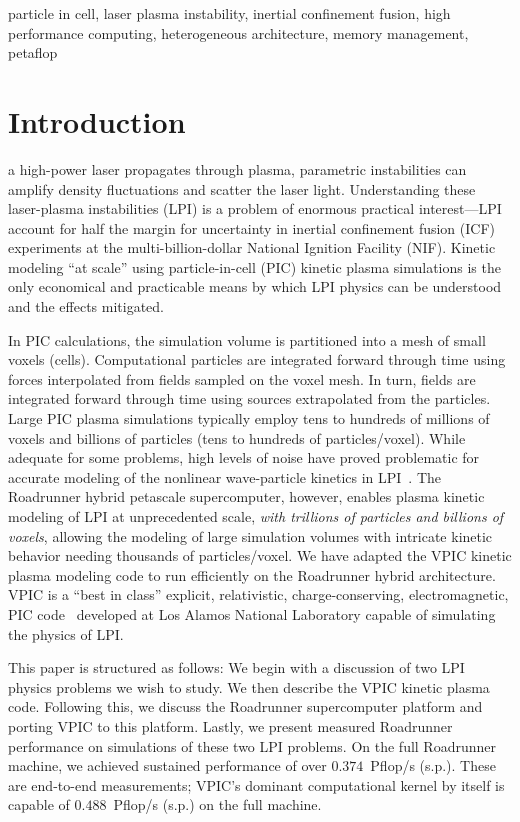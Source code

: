 \documentclass[journal,twoside]{IEEEtran}
\begin{document}
\begin{IEEEkeywords}
particle in cell,
laser plasma instability,
inertial confinement fusion,
high performance computing,
heterogeneous architecture,
memory management,
petaflop
\end{IEEEkeywords}

\section{Introduction}

 a high-power laser propagates through plasma,
parametric instabilities can amplify density fluctuations and scatter
the laser light.  Understanding these laser-plasma instabilities (LPI)
is a problem of enormous practical interest---LPI account for half the
margin for uncertainty in inertial confinement fusion (ICF)
experiments at the multi-billion-dollar National Ignition Facility
(NIF).  Kinetic modeling ``at scale'' using particle-in-cell (PIC)
kinetic plasma simulations is the only economical and practicable
means by which LPI physics can be understood and the effects
mitigated.

In PIC calculations, the simulation volume is partitioned into a mesh
of small voxels (cells).  Computational particles are integrated
forward through time using forces interpolated from fields sampled on
the voxel mesh.  In turn, fields are integrated forward through time
using sources extrapolated from the particles.  Large PIC plasma
simulations typically employ tens to hundreds of millions of voxels
and billions of particles (tens to hundreds of particles/voxel).
While adequate for some problems, high levels of noise have proved
problematic for accurate modeling of the nonlinear wave-particle
kinetics in LPI~\cite{Yin_et_al_Phys_Plasmas_2006}.  The Roadrunner
hybrid petascale supercomputer, however, enables plasma kinetic
modeling of LPI at unprecedented scale, \textit{with trillions of
particles and billions of voxels}, allowing the modeling of large
simulation volumes with intricate kinetic behavior needing thousands
of particles/voxel.  We have adapted the VPIC kinetic plasma modeling
code to run efficiently on the Roadrunner hybrid architecture.  VPIC
is a ``best in class'' explicit, relativistic, charge-conserving,
electromagnetic, PIC code~\cite{Bowers_et_al_Phys_Plasmas_2007}
developed at Los Alamos National Laboratory capable of simulating the
physics of LPI.

This paper is structured as follows: We begin with a discussion of two
LPI physics problems we wish to study.  We then describe the VPIC
kinetic plasma code.  Following this, we discuss the Roadrunner
supercomputer platform and porting VPIC to this platform.  Lastly, we
present measured Roadrunner performance on simulations of these two
LPI problems.  On the full Roadrunner machine, we achieved sustained
performance of over $0.374$~Pflop/s (s.p.).  These are end-to-end
measurements; VPIC's dominant computational kernel by itself is
capable of $0.488$~Pflop/s (s.p.) on the full machine.
\end{document}
